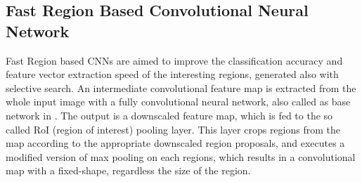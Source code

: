 \subsection{Fast Region Based Convolutional Neural Network}\label{s:c-fastrcnn}
Fast Region based CNNs \cite{Girshick:2016:RCN:2881668.2882239} are aimed to improve the classification accuracy and feature vector extraction speed of the interesting regions, generated also with selective search. An intermediate convolutional feature map is extracted from the whole input image with a fully convolutional neural network, also called as base network in \citep{journals/corr/SermanetEZMFL13}. The output is a downscaled feature map, which is fed to the so called RoI (region of interest) pooling layer. This layer crops regions from the map according to the appropriate downscaled region proposals, and executes a modified version of max pooling on each regions, which results in a convolutional map with a fixed-shape, regardless the size of the region.

